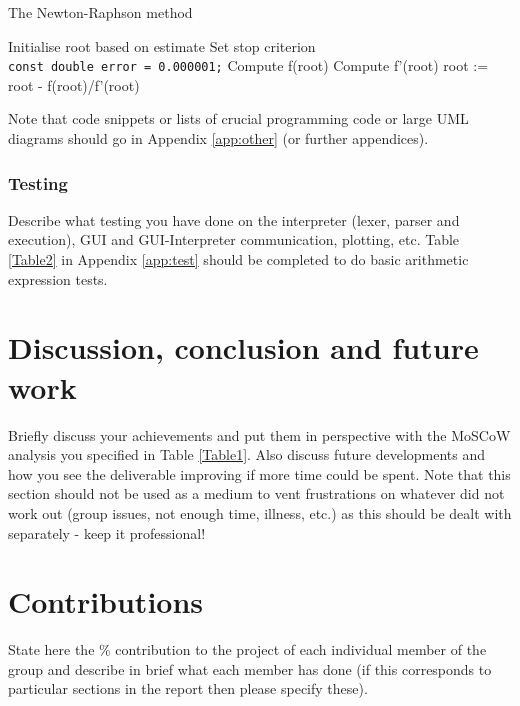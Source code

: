 \documentclass[a4paper, oneside, 11pt]{report}
\begin{document}
\begin{algorithm}[th]
\caption{ The Newton-Raphson method }
\begin{algorithmic}[1]
\STATE Initialise root based on estimate
\STATE Set stop criterion
\\ \texttt{const double error = 0.000001;}
	\STATE Compute f(root)
	\STATE Compute f'(root)
	\STATE root := root - f(root)/f'(root)
\ENDWHILE
\end{algorithmic}
\end{algorithm}


Note that code snippets or lists of crucial programming code or large UML diagrams should go in Appendix \ref{app:other} (or further appendices).

\subsection{Testing}

Describe what testing you have done on the interpreter (lexer, parser and execution), GUI and GUI-Interpreter communication, plotting, etc. Table \ref{Table2} in Appendix \ref{app:test} should be completed to do basic arithmetic expression tests.


\chapter{Discussion, conclusion and future work}

Briefly discuss  your achievements and put them in perspective with the MoSCoW analysis you specified in Table \ref{Table1}. Also discuss future developments and how you see the deliverable improving if more time could be spent. Note that this section should not be used as a medium to vent frustrations on whatever did not work out (group issues, not enough time, illness, etc.) as this should be dealt with separately - keep it professional!



\raggedright



\appendix
\chapter{Contributions}

State here the \% contribution to the project of each individual member of the group and describe in brief what each member has done (if this corresponds to particular sections in the report then please specify these).
\end{document}
